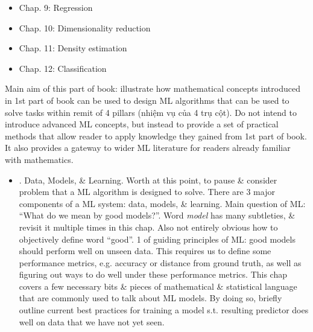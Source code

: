 \documentclass{article}
\begin{document}
\begin{enumerate}
\begin{itemize}
		\begin{itemize}
			\item Chap. 9: Regression
			\item Chap. 10: Dimensionality reduction
			\item Chap. 11: Density estimation
			\item Chap. 12: Classification
		\end{itemize}
		Main aim of this part of book: illustrate how mathematical concepts introduced in 1st part of book can be used to design ML algorithms that can be used to solve tasks within remit of 4 pillars (nhiệm vụ của 4 trụ cột). Do not intend to introduce advanced ML concepts, but instead to provide a set of practical methods that allow reader to apply knowledge they gained from 1st part of book. It also provides a gateway to wider ML literature for readers already familiar with mathematics.
		\begin{itemize}
			\item {. Data, Models, \& Learning.} Worth at this point, to pause \& consider problem that a ML algorithm is designed to solve. There are 3 major components of a ML system: data, models, \& learning. Main question of ML: ``What do we mean by good models?''. Word {\it model} has many subtleties, \& revisit it multiple times in this chap. Also not entirely obvious how to objectively define word ``good''. 1 of guiding principles of ML: good models should perform well on unseen data. This requires us to define some performance metrics, e.g. accuracy or distance from ground truth, as well as figuring out ways to do well under these performance metrics. This chap covers a few necessary bits \& pieces of mathematical \& statistical language that are commonly used to talk about ML models. By doing so, briefly outline current best practices for training a model s.t. resulting predictor does well on data that we have not yet seen.
			

\end{itemize}
\end{itemize}
\end{enumerate}
\end{document}
